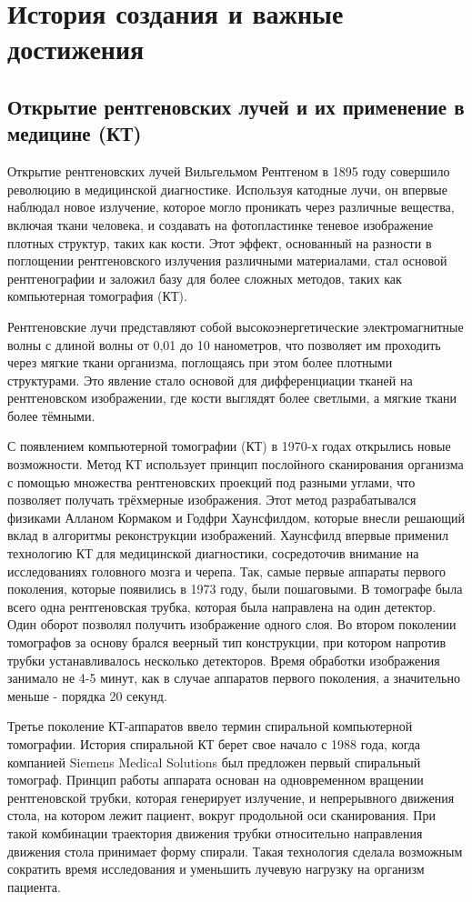 \section{История создания и важные достижения}
\subsection{Открытие рентгеновских лучей и их применение в медицине (КТ)}
Открытие рентгеновских лучей Вильгельмом Рентгеном в 1895 году совершило революцию в медицинской диагностике. Используя катодные лучи, он впервые наблюдал новое излучение, которое могло проникать через различные вещества, включая ткани человека, и создавать на фотопластинке теневое изображение плотных структур, таких как кости. Этот эффект, основанный на разности в поглощении рентгеновского излучения различными материалами, стал основой рентгенографии и заложил базу для более сложных методов, таких как компьютерная томография (КТ)\cite{history}.

Рентгеновские лучи представляют собой высокоэнергетические электромагнитные волны с длиной волны от 0,01 до 10 нанометров, что позволяет им проходить через мягкие ткани организма, поглощаясь при этом более плотными структурами. Это явление стало основой для дифференциации тканей на рентгеновском изображении, где кости выглядят более светлыми, а мягкие ткани более тёмными\cite{history}.

С появлением компьютерной томографии (КТ) в 1970-х годах открылись новые возможности. Метод КТ использует принцип послойного сканирования организма с помощью множества рентгеновских проекций под разными углами, что позволяет получать трёхмерные изображения. Этот метод разрабатывался физиками Алланом Кормаком и Годфри Хаунсфилдом, которые внесли решающий вклад в алгоритмы реконструкции изображений. Хаунсфилд впервые применил технологию КТ для медицинской диагностики, сосредоточив внимание на исследованиях головного мозга и черепа\cite{history}.
Так, самые первые аппараты первого поколения, которые появились в 1973 году, были пошаговыми. В томографе была всего одна рентгеновская трубка, которая была направлена на один детектор. Один оборот позволял получить изображение одного слоя. Во втором поколении томографов за основу брался веерный тип конструкции, при котором напротив трубки устанавливалось несколько детекторов. Время обработки изображения занимало не 4-5 минут, как в случае аппаратов первого поколения, а значительно меньше - порядка 20 секунд\cite{one}.

Третье поколение КТ-аппаратов ввело термин спиральной компьютерной томографии. История спиральной КТ берет свое начало с 1988 года, когда компанией Siemens Medical Solutions был предложен первый спиральный томограф. Принцип работы аппарата основан на одновременном вращении рентгеновской трубки, которая генерирует излучение, и непрерывного движения стола, на котором лежит пациент, вокруг продольной оси сканирования. При такой комбинации траектория движения трубки относительно направления движения стола принимает форму спирали. Такая технология сделала возможным сократить время исследования и уменьшить лучевую нагрузку на организм пациента\cite{one}.

